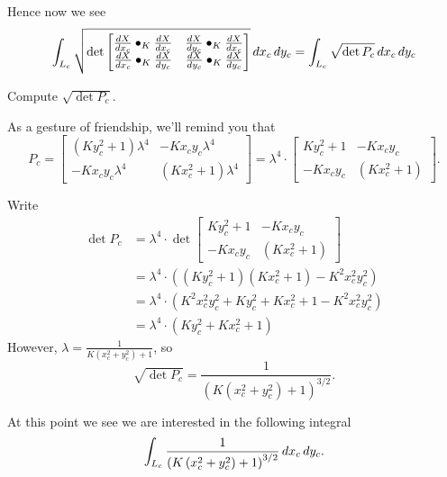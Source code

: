 \documentclass{ximera}
\begin{document}
Hence now we see 
\[
\int_{L_c} \sqrt{
  \det
  \begin{bmatrix}
    \dd[X]{x_c}\bullet_K \dd[X]{x_c} & \dd[X]{y_c}\bullet_K \dd[X]{x_c} \\
    \dd[X]{x_c}\bullet_K \dd[X]{y_c} & \dd[X]{y_c}\bullet_K \dd[X]{y_c}
  \end{bmatrix}
}\d x_c\d y_c = \int_{L_c} \sqrt{\det P_c}\d x_c\d y_c
\]
\begin{problem}
  Compute $\sqrt{\det P_c}$.
  \begin{hint}
    As a gesture of friendship, we'll remind you that
    \[
 P_c =
     \begin{bmatrix}
       \left(Ky_c^2+1\right)\lambda^4 & -Kx_{c}y_{c}\lambda^4\\
       -Kx_{c}y_{c}\lambda^4 & \left(Kx_c^2+1\right)\lambda^4
     \end{bmatrix} = \lambda^4 \cdot \begin{bmatrix}
       Ky_c^2+1 & -Kx_{c}y_{c}\\
       -Kx_{c}y_{c} & \left(Kx_c^2+1\right)
     \end{bmatrix}.
    \]
  \end{hint}
  \begin{freeResponse}
    Write
    \begin{align*}
    \det P_c &= \lambda^4\cdot \det \begin{bmatrix}
       Ky_c^2+1 & -Kx_{c}y_{c}\\
       -Kx_{c}y_{c} & \left(Kx_c^2+1\right)
    \end{bmatrix}\\
    &= \lambda^4\cdot\left(\left( Ky_c^2+1\right)\left(Kx_c^2+1\right) - K^2x_{c}^2y_{c}^2\right)\\
    &= \lambda^4\cdot\left(K^2x_{c}^2y_{c}^2 + Ky_c^2+Kx_c^2+1-K^2x_{c}^2y_{c}^2\right)\\
    &= \lambda^4\cdot\left(Ky_c^2+Kx_c^2+1\right)
    \end{align*}
    However, $\lambda = \frac{1}{K\left(x_c^2+y_c^2\right)+1}$, so
    \[
    \sqrt{\det P_c} = \frac{1}{\left(K\left(x_c^2+y_c^2\right)+1\right)^{3/2}}.
    \]
  \end{freeResponse}
\end{problem}

At this point we see we are interested in the following integral
\[
\int_{L_c} \frac{1}{\left(K\left(x_c^2+y_c^2\right)+1\right)^{3/2}} \d x_c\d y_c.
\]
\end{document}
